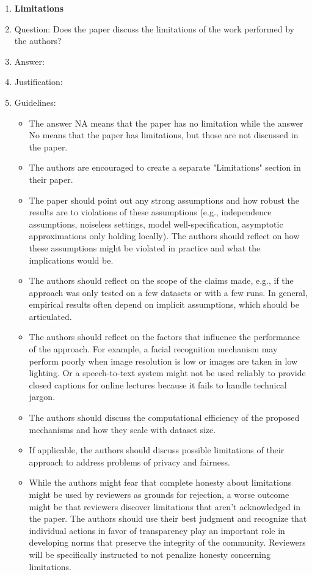 \documentclass{article}
\begin{document}
\begin{enumerate}
\item {\bf Limitations}
    \item[] Question: Does the paper discuss the limitations of the work performed by the authors?
    \item[] Answer: \answerTODO{} %
    \item[] Justification: \justificationTODO{}
    \item[] Guidelines:
    \begin{itemize}
        \item The answer NA means that the paper has no limitation while the answer No means that the paper has limitations, but those are not discussed in the paper. 
        \item The authors are encouraged to create a separate "Limitations" section in their paper.
        \item The paper should point out any strong assumptions and how robust the results are to violations of these assumptions (e.g., independence assumptions, noiseless settings, model well-specification, asymptotic approximations only holding locally). The authors should reflect on how these assumptions might be violated in practice and what the implications would be.
        \item The authors should reflect on the scope of the claims made, e.g., if the approach was only tested on a few datasets or with a few runs. In general, empirical results often depend on implicit assumptions, which should be articulated.
        \item The authors should reflect on the factors that influence the performance of the approach. For example, a facial recognition mechanism may perform poorly when image resolution is low or images are taken in low lighting. Or a speech-to-text system might not be used reliably to provide closed captions for online lectures because it fails to handle technical jargon.
        \item The authors should discuss the computational efficiency of the proposed mechanisms and how they scale with dataset size.
        \item If applicable, the authors should discuss possible limitations of their approach to address problems of privacy and fairness.
        \item While the authors might fear that complete honesty about limitations might be used by reviewers as grounds for rejection, a worse outcome might be that reviewers discover limitations that aren't acknowledged in the paper. The authors should use their best judgment and recognize that individual actions in favor of transparency play an important role in developing norms that preserve the integrity of the community. Reviewers will be specifically instructed to not penalize honesty concerning limitations.
    \end{itemize}


\end{enumerate}
\end{document}
